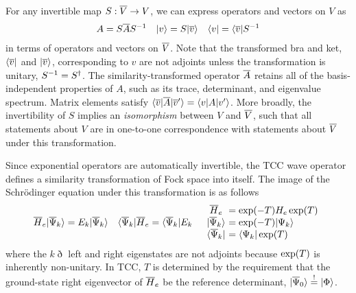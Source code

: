 \documentclass[11pt]{article}
\numberwithin{equation}{section}
\begin{document}
\begin{dfn}
For any invertible map $S:\overline{V}\rightarrow V$, we can express operators and vectors on $V$ as
\begin{align}
  A
=
  S
  \overline{A}
  S^{-1}
&&
  |v\rangle
=
  S
  |\overline{v}\rangle
&&
  \langle v|
=
  \langle\overline{v}|
  S^{-1}
\end{align}
in terms of operators and vectors on $\overline{V}$.
Note that the transformed bra and ket, $\langle\overline{v}|$ and $|\overline{v}\rangle$, corresponding to $v$ are not adjoints unless the transformation is unitary, $S^{-1}=S^\dagger$.
The similarity-transformed operator $\overline{A}$ retains all of the basis-independent properties of $A$, such as its trace, determinant, and eigenvalue spectrum.
Matrix elements satisfy $\langle\overline{v}|\overline{A}|\overline{v}'\rangle=\langle v|A|v'\rangle$.
More broadly, the invertibility of $S$ implies an \textit{isomorphism} between $V$ and $\overline{V}$, such that all statements about $V$ are in one-to-one correspondence with statements about $\overline{V}$ under this transformation.
\end{dfn}


\begin{rmk}
Since exponential operators are automatically invertible, the TCC wave operator defines a similarity transformation of Fock space into itself.
The image of the Schr\"odinger equation under this transformation is as follows
\begin{align}
\label{eq:similarity-transformed-schrodinger-equation}
  \ol{H}_e
  \kt{\ol{\Y}_k}
=
  E_k
  \kt{\ol{\Y}_k}
&&
  \br{\ol{\Y}_k}
  \ol{H}_e
=
  \br{\ol{\Y}_k}
  E_k
&&
\begin{array}{c@{\ }l}
  \ol{H}_e
&=
  \mr{exp}(-T)
  H_e\,
  \mr{exp}(T)
\\
  \kt{\ol{\Y}_k}
&=
  \mr{exp}(-T)
  \kt{\Y_k}
\\
  \br{\ol{\Y}_k}
&=
  \br{\Y_k}\,
  \mr{exp}(T)
\end{array}
\end{align}
where the $k\eth$ left and right eigenstates are not adjoints because $\mathrm{exp}(T)$ is inherently non-unitary.
In TCC, $T$ is determined by the requirement that the ground-state right eigenvector of $\overline{H}_e$ be the reference determinant,
$
  |\overline{\Psi }_0\rangle
\overset{!}{=}
  |\Phi \rangle
$.
\end{rmk}
\end{document}
